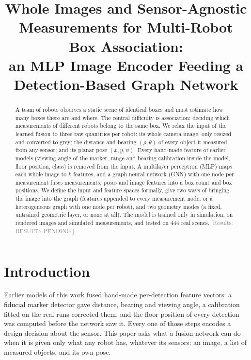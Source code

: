 \documentclass[conference]{IEEEtran}
\begin{document}
\title{Whole Images and Sensor-Agnostic Measurements for Multi-Robot Box Association:\\
an MLP Image Encoder Feeding a Detection-Based Graph Network}

\author{
}

\maketitle

\begin{abstract}
A team of robots observes a static scene of identical boxes and must estimate how many boxes there are and where.
The central difficulty is association: deciding which measurements of different robots belong to the same box.
We relax the input of the learned fusion to three raw quantities per robot: its whole camera image, only resized
and converted to grey; the distance and bearing $(\rho,\theta)$ of every object it measured, from any sensor; and its
planar pose $(x,y,\psi)$. Every hand-made feature of earlier models (viewing angle of the marker, range and bearing
calibration inside the model, floor position, class) is removed from the input. A multilayer perceptron (MLP) maps
each whole image to $k$ features, and a graph neural network (GNN) with one node per measurement fuses measurements,
poses and image features into a box count and box positions. We define the input and feature spaces formally, give
two ways of bringing the image into the graph (features appended to every measurement node, or a heterogeneous graph
with one node per robot), and two geometry modes (a fixed, untrained geometric layer, or none at all). The model is
trained only in simulation, on rendered images and simulated measurements, and tested on 444 real scenes.
\textcolor{gray}{[Results: RESULTS-PENDING.]}
\end{abstract}

\section{Introduction}

Earlier models of this work fused hand-made per-detection feature vectors: a fiducial marker detector gave distance,
bearing and viewing angle, a calibration fitted on the real runs corrected them, and the floor position of every
detection was computed before the network saw it. Every one of those steps encodes a design decision about the
sensor. This paper asks what a fusion network can do when it is given only what any robot has, whatever its
sensors: an image, a list of measured objects, and its own pose.
\end{document}
